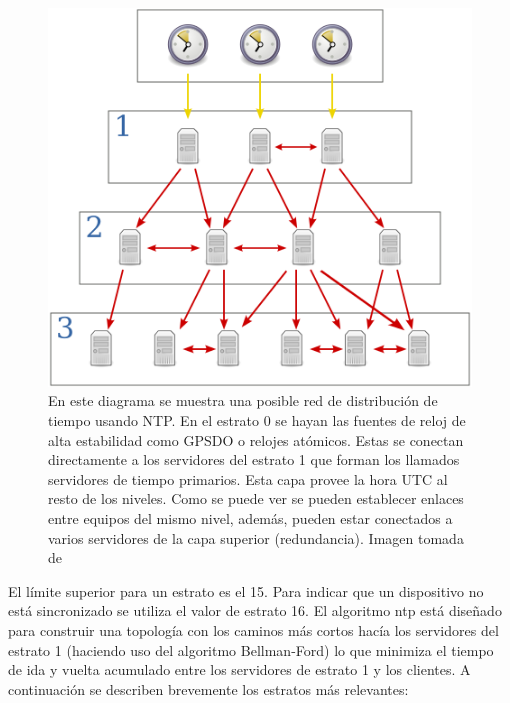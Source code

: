 \begin{figure}
	\centering
	\includegraphics[width=0.7\linewidth]{imagenes/ntp_tree}
	\caption[Esquema de una red de distribución de tiempo usando NTP.]{En este 
	diagrama se 
	muestra una posible red de distribución de tiempo usando NTP. En el estrato 
	0 se hayan las fuentes de reloj de alta estabilidad como GPSDO o relojes 
	atómicos. Estas se conectan directamente a los servidores del estrato 1 que 
	forman los llamados servidores de tiempo primarios. Esta capa provee la 
	hora UTC al resto de los niveles. Como se puede ver se pueden establecer 
	enlaces entre equipos del mismo nivel, además, pueden estar conectados a 
	varios servidores de la capa superior (redundancia). Imagen tomada de 
	\cite{website:imgNTPtree}}
	\label{fig:ntptree}
\end{figure}


El límite superior para un estrato es el 15. Para indicar que un dispositivo no 
está sincronizado se utiliza el valor de estrato 16. El algoritmo \gls{ntp} 
está diseñado para construir una topología con los caminos más cortos hacía los 
servidores del estrato 1 (haciendo uso del algoritmo Bellman-Ford) lo que 
minimiza el tiempo de ida y vuelta acumulado entre los servidores de estrato 1 
y los clientes. A continuación se describen brevemente los estratos más 
relevantes:

